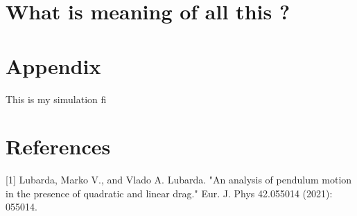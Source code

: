 \documentclass[11pt,a4paper]{article}
\begin{document}
\section{What is meaning of all this ?}
\label{sec:org5d33c53}
\section{Appendix}
\label{sec:org0693602}

This is my simulation fi

\section{References}
\label{sec:org2a1b454}

[1] Lubarda, Marko V., and Vlado A. Lubarda. "An analysis of pendulum motion in the presence of quadratic and linear drag." Eur. J. Phys 42.055014 (2021): 055014.
\end{document}
